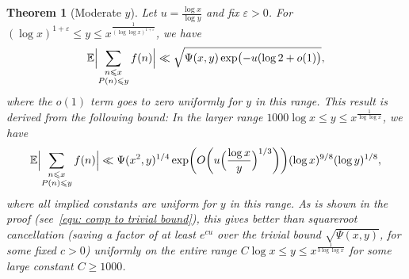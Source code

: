\documentclass[10pt,a4paper]{amsart}
\newtheorem{theorem}{Theorem}
\def\E{\mathbb E}
\def\leq {\leqslant}
\begin{document}
\begin{theorem}[Moderate $y$]\label{Thm: main quantitative}
Let $u = \frac{\log x}{\log y}$ and fix $\varepsilon > 0$. For $(\log x)^{1 + \varepsilon} \leq y \leq x^{\frac{1}{(\log \log x)^{1 + \varepsilon}}}$, we have
\begin{equation}\label{equ: alt statement}
\E \Bigl| \sum_{\substack{n \leq x \\ P(n) \leq y}} f(n) \Bigr| \ll \sqrt{\Psi(x,y) \exp \bigl( -u (\log 2 + o(1) \bigr)},
\end{equation}
where the $o(1)$ term goes to zero uniformly for $y$ in this range. This result is derived from the following bound: In the larger range $1000 \log x \leq y \leq x^{\frac{1}{\log \log x}} $, we have
\[
\E \Bigl| \sum_{\substack{n \leq x \\ P(n) \leq y}} f(n) \Bigr| \ll \Psi(x^2, y)^{1/4} \exp \biggl( O \biggl( u \Bigl( \frac{\log x}{y} \Bigr)^{1/3} \biggr) \biggr) (\log x)^{9/8} (\log y)^{1/8},
\]
where all implied constants are uniform for $y$ in this range. As is shown in the proof (see~\eqref{equ: comp to trivial bound}), this
gives better than squareroot cancellation (saving a factor of at least $e^{cu}$ over the trivial bound $\sqrt{\Psi(x,y)}$, for some fixed $c>0$) uniformly on the entire range $C \log x \leq y \leq x^{\frac{1}{3 \log \log x}} $ for some large constant $C \geq 1000$.
\end{theorem}
\end{document}
